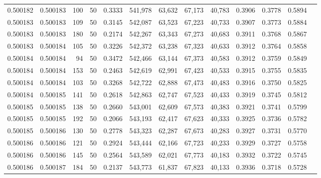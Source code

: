\begin{tabular}{rrrrrrrrrrrrr}
0.500182 & 0.500183 &   100 &  50 &                                     0.3333 & 541,978 &  63,632 &  67,173 &  40,783 & 0.3906 & 0.3778 & 0.5894 \\
0.500183 & 0.500183 &   109 &  50 &                                     0.3145 & 542,087 &  63,523 &  67,223 &  40,733 & 0.3907 & 0.3773 & 0.5884 \\
0.500183 & 0.500183 &   180 &  50 &                                     0.2174 & 542,267 &  63,343 &  67,273 &  40,683 & 0.3911 & 0.3768 & 0.5867 \\
0.500183 & 0.500184 &   105 &  50 &                                     0.3226 & 542,372 &  63,238 &  67,323 &  40,633 & 0.3912 & 0.3764 & 0.5858 \\
0.500184 & 0.500184 &    94 &  50 &                                     0.3472 & 542,466 &  63,144 &  67,373 &  40,583 & 0.3912 & 0.3759 & 0.5849 \\
0.500184 & 0.500184 &   153 &  50 &                                     0.2463 & 542,619 &  62,991 &  67,423 &  40,533 & 0.3915 & 0.3755 & 0.5835 \\
0.500184 & 0.500184 &   103 &  50 &                                     0.3268 & 542,722 &  62,888 &  67,473 &  40,483 & 0.3916 & 0.3750 & 0.5825 \\
0.500184 & 0.500185 &   141 &  50 &                                     0.2618 & 542,863 &  62,747 &  67,523 &  40,433 & 0.3919 & 0.3745 & 0.5812 \\
0.500185 & 0.500185 &   138 &  50 &                                     0.2660 & 543,001 &  62,609 &  67,573 &  40,383 & 0.3921 & 0.3741 & 0.5799 \\
0.500185 & 0.500185 &   192 &  50 &                                     0.2066 & 543,193 &  62,417 &  67,623 &  40,333 & 0.3925 & 0.3736 & 0.5782 \\
0.500185 & 0.500186 &   130 &  50 &                                     0.2778 & 543,323 &  62,287 &  67,673 &  40,283 & 0.3927 & 0.3731 & 0.5770 \\
0.500186 & 0.500186 &   121 &  50 &                                     0.2924 & 543,444 &  62,166 &  67,723 &  40,233 & 0.3929 & 0.3727 & 0.5758 \\
0.500186 & 0.500186 &   145 &  50 &                                     0.2564 & 543,589 &  62,021 &  67,773 &  40,183 & 0.3932 & 0.3722 & 0.5745 \\
0.500186 & 0.500187 &   184 &  50 &                                     0.2137 & 543,773 &  61,837 &  67,823 &  40,133 & 0.3936 & 0.3718 & 0.5728 \\

\end{tabular}
